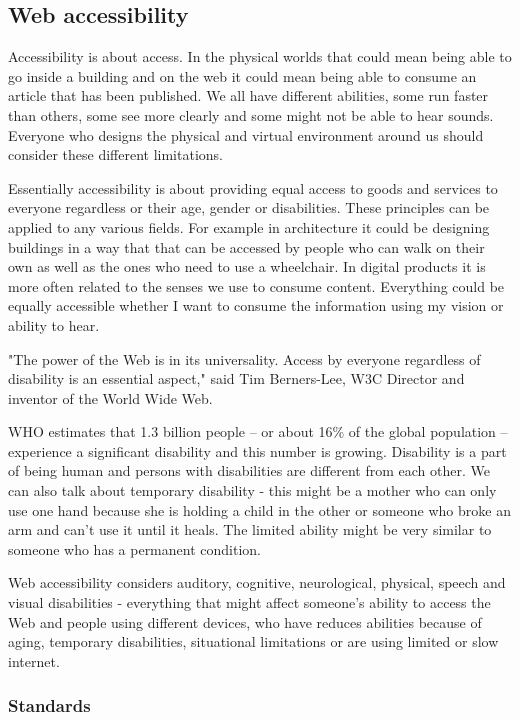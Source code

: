 \documentclass{master_thesis}
\begin{document}
\subsection{Web accessibility}

Accessibility is about access. In the physical worlds that could mean being able to go inside a building and on the web it could mean being able to consume an article that has been published. We all have different abilities, some run faster than others, some see more clearly and some might not be able to hear sounds. Everyone who designs the physical and virtual environment around us should consider these different limitations.

Essentially accessibility is about providing equal access to goods and services to everyone regardless or their age, gender or disabilities. These principles can be applied to any various fields. For example in architecture it could be designing buildings in a way that that can be accessed by people who can walk on their own as well as the ones who need to use a wheelchair. In digital products it is more often related to the senses we use to consume content. Everything could be equally accessible whether I want to consume the information  using my vision or ability to hear.

"The power of the Web is in its universality. Access by everyone regardless of disability is an essential aspect," said Tim Berners-Lee, W3C Director and inventor of the World Wide Web\citep{WWWC1997}.

WHO estimates that 1.3 billion people – or about 16\% of the global population – experience a significant disability and this number is growing. Disability is a part of being human and persons with disabilities are different from each other. \citep{WHO2022} We can also talk about temporary disability - this might be a mother who can only use one hand because she is holding a child in the other or someone who broke an arm and can't use it until it heals. The limited ability might be very similar to someone who has a permanent condition.

Web accessibility considers auditory, cognitive, neurological, physical, speech and visual  disabilities - everything that might affect someone's ability to access the Web and people using different devices, who have reduces abilities because of aging, temporary disabilities, situational limitations or are using limited or slow internet. \citep{Henry2022}

\subsubsection{Standards}
\end{document}
